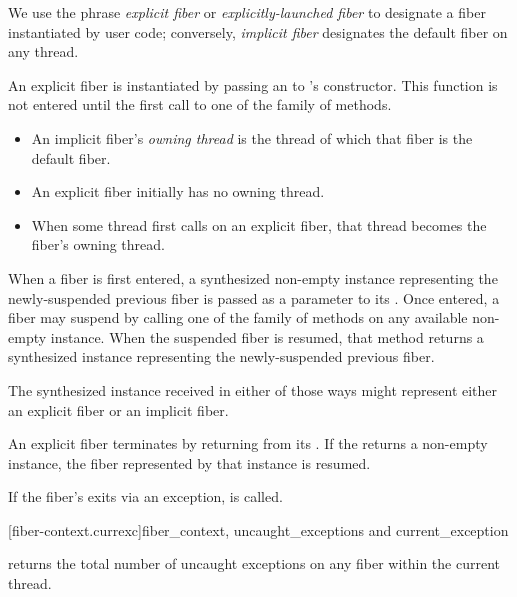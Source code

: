 We use the phrase \emph{explicit fiber} or \emph{explicitly-launched fiber} to
designate a fiber instantiated by user code; conversely, \emph{implicit fiber}
designates the default fiber on any thread.

An explicit fiber is instantiated by passing an \emph{\entryfn} to \fiber's
constructor. This function is not entered until the first call to one of
the  family of methods.

\begin{itemize}
    \item An implicit fiber's \emph{owning thread} is the thread of which that
          fiber is the default fiber.
    \item An explicit fiber initially has no owning thread.
    \item When some thread first calls \anyresume on an explicit fiber, that
          thread becomes the fiber's owning thread.
\end{itemize}

When a fiber is first entered, a synthesized non-empty \fiber instance
representing the newly-suspended previous fiber is passed as a parameter to
its \entryfn. Once entered, a fiber may suspend by calling one of the \resume
family of methods on any available non-empty \fiber instance. When the
suspended fiber is resumed, that method returns a synthesized \fiber instance
representing the newly-suspended previous fiber.

The synthesized \fiber instance received in either of those ways might
represent either an explicit fiber or an implicit fiber.

An explicit fiber terminates by returning from its \entryfn. If the \entryfn
returns a non-empty \fiber instance, the fiber represented by that \fiber
instance is resumed.



If the fiber's \entryfn exits via an exception,  is called.

[fiber-context.currexc]{fiber\_context, uncaught\_exceptions and current\_exception}

 returns the total number of uncaught exceptions on
any fiber within the current thread.

